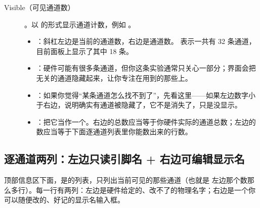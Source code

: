 \documentclass[11pt,oneside,openany]{book}
\begin{document}
\begin{description}
\item[Visible（可见通道数）] 。以  的形式显示通道计数，例如 。
  \begin{itemize}
  \item {}：斜杠左边是当前的通道数，右边是通道数。 表示一共有 32 条通道，目前面板上显示了其中 18 条。
  \item {}：硬件可能有很多条通道，但你这条实验通常只关心一部分；界面会把无关的通道隐藏起来，让你专注在用到的那些上。
  \item {}：如果你觉得“某条通道怎么找不到了”，先看这里——如果左边数字小于右边，说明确实有通道被隐藏了，它不是消失了，只是没显示。
  \item {}：把它当作一个。右边的总数应当等于你硬件实际的通道总数；左边的数应当等于下面逐通道列表里你能数出来的行数。
  \end{itemize}
\end{description}

\subsection{逐通道两列：左边只读引脚名 + 右边可编辑显示名}

顶部信息区下面，是的列表，只列出当前可见的那些通道（也就是  左边那个数那么多行）。每一行有两列：左边是硬件给定的、改不了的物理名字；右边是一个你可以随便改的、好记的显示名输入框。
\end{document}
